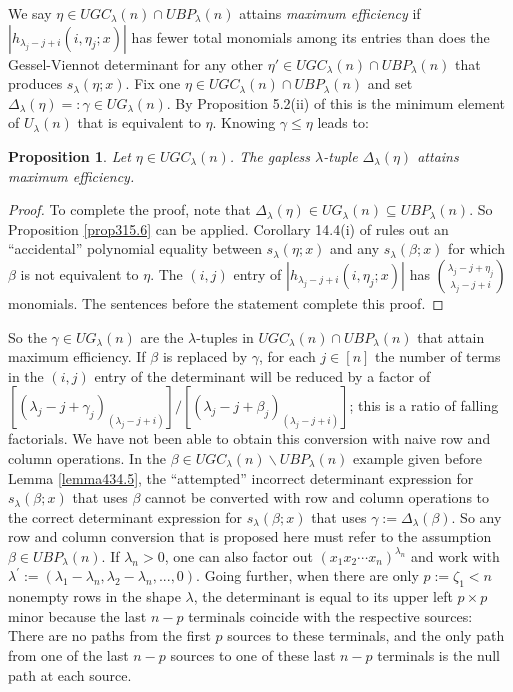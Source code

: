 \documentclass[11pt]{article}
\newtheorem{prop}[thm]{Proposition}
\theoremstyle{definition}
\theoremstyle{remark}
\numberwithin{equation}{section}
\begin{document}
\begin{spacing}{1.35}
We say $\eta \in UGC_\lambda(n) \cap UBP_\lambda(n)$ attains \emph{maximum efficiency} if $|h_{\lambda_j-j+i}(i,\eta_j;x)|$ has fewer total monomials among its entries than does the Gessel-Viennot determinant for any other $\eta' \in UGC_\lambda(n) \cap UBP_\lambda(n)$ that produces $s_\lambda(\eta;x)$.  Fix one $\eta \in UGC_\lambda(n) \cap UBP_\lambda(n)$ and set $\Delta_\lambda(\eta) =: \gamma \in UG_\lambda(n)$.  By Proposition 5.2(ii) of \cite{PW} this is the minimum element of $U_\lambda(n)$ that is equivalent to $\eta$.  Knowing $\gamma \leq \eta$ leads to:

\begin{prop}\label{prop826.9}  Let $\eta \in UGC_\lambda(n)$.  The gapless $\lambda$-tuple $\Delta_\lambda(\eta)$ attains maximum efficiency. \end{prop}

\begin{proof}To complete the proof, note that $\Delta_\lambda(\eta) \in UG_\lambda(n) \subseteq UBP_\lambda(n)$.  So Proposition \ref{prop315.6} can be applied.  Corollary 14.4(i) of \cite{PW} rules out an ``accidental'' polynomial equality between $s_\lambda(\eta;x)$ and any $s_\lambda(\beta;x)$ for which $\beta$ is not equivalent to $\eta$.  The $(i,j)$ entry of $|h_{\lambda_j-j+i}(i,\eta_j;x)|$ has ${\lambda_j - j + \eta_j \choose \lambda_j -j +i}$ monomials.  The sentences before the statement complete this proof. \end{proof}



So the $\gamma \in UG_\lambda(n)$ are the $\lambda$-tuples in $UGC_\lambda(n) \cap UBP_\lambda(n)$ that attain maximum efficiency.  If $\beta$ is replaced by $\gamma$, for each $j \in [n]$ the number of terms in the $(i,j)$ entry of the determinant will be reduced by a factor of  $[(\lambda_j-j+\gamma_j)_{(\lambda_j-j+i)}] \slash [(\lambda_j-j+\beta_j)_{(\lambda_j-j+i)}]$;  this is a ratio of falling factorials.  We have not been able to obtain this conversion with naive row and column operations.  In the $\beta \in UGC_\lambda(n) \backslash UBP_\lambda(n)$ example given before Lemma \ref{lemma434.5}, the ``attempted'' incorrect determinant expression for $s_\lambda(\beta;x)$ that uses $\beta$ cannot be converted with row and column operations to the correct determinant expression for $s_\lambda(\beta;x)$ that uses $\gamma := \Delta_\lambda(\beta)$.  So any row and column conversion that is proposed here must refer to the assumption $\beta \in UBP_\lambda(n)$.  If $\lambda_n > 0$, one can also factor out $(x_1x_2 \cdots x_n)^{\lambda_n}$ and work with $\lambda^\prime := (\lambda_1 - \lambda_n, \lambda_2 - \lambda_n, ... , 0)$.  Going further, when there are only $p := \zeta_1 < n$ nonempty rows in the shape $\lambda$, the determinant is equal to its upper left $p \times p$ minor because the last $n-p$ terminals coincide with the respective sources:  There are no paths from the first $p$ sources to these terminals, and the only path from one of the last $n-p$ sources to one of these last $n-p$ terminals is the null path at each source.




\end{spacing}
\end{document}
